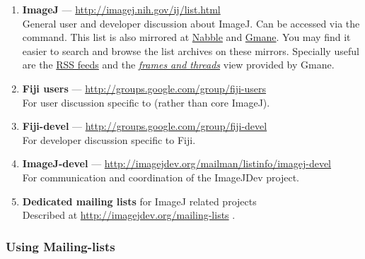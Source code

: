 \begin{enumerate}
\begin{enumerate}
\item \textbf{ImageJ} --- \url{http://imagej.nih.gov/ij/list.html}\\
General user and developer discussion about ImageJ. Can be accessed
via the \textsf{}
command. This list is also mirrored at \href{http://imagej.1557.n6.nabble.com/}{Nabble}
and \href{http://dir.gmane.org/gmane.comp.java.imagej}{Gmane}. You
may find it easier to search and browse the list archives on these
mirrors. Specially useful are the \href{feed://rss.gmane.org/topics/excerpts/gmane.comp.java.imagej}{RSS feeds}
and the\emph{ \href{http://news.gmane.org/gmane.comp.java.imagej}{frames and threads}}
view provided by Gmane.
\item \textbf{Fiji users }--- \url{http://groups.google.com/group/fiji-users}\\
For user discussion specific to  (rather
than core ImageJ).
\item \textbf{Fiji-devel} --- \url{http://groups.google.com/group/fiji-devel}\\
For developer discussion specific to Fiji.
\item \textbf{ImageJ-devel} --- \url{http://imagejdev.org/mailman/listinfo/imagej-devel}\\
For communication and coordination of the ImageJDev project.
\item \textbf{Dedicated mailing lists} for ImageJ related projects\\
Described at \url{http://imagejdev.org/mailing-lists} .
\end{enumerate}
\end{enumerate}

\subsubsection*{Using Mailing-lists}

